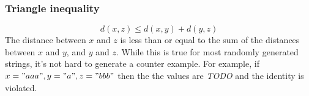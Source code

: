 \documentclass{article}
\newcommand{\cm}[1]{\textit{{\color{blue}#1}}}
\begin{document}
\subsubsection{Triangle inequality} 
\[
d(x, z) \leq d(x, y) + d(y, z)
\]
The distance between \( x \) and \( z \) is less than or equal to the sum of the distances between \( x \) and \( y \), and \( y \) and \( z \). While this is true for most randomly generated strings, it's not hard to generate a counter example. For example, if $x = "aaa", y = "a", z = "bbb"$ then the the values are \cm{TODO} and the identity is violated.






\end{document}
